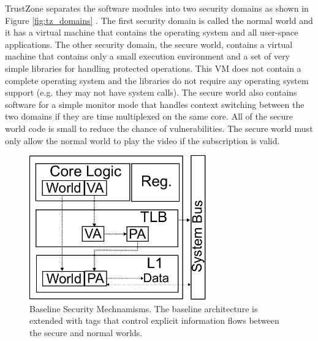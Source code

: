     TrustZone separates the software modules into two security domains as shown 
    in Figure \ref{fig:tz_domains} . The first security domain is called the 
    normal world and it has a virtual machine that contains the operating 
    system and all user-space applications. The other security domain, the 
    secure world, contains a virtual machine that contains only a small 
    execution environment and a set of very simple libraries for handling 
    protected operations. This VM does not contain a complete operating system 
    and the libraries do not require any operating system support (e.g. they 
    may not have system calls). The secure world also contains software for a 
    simple monitor mode that handles context switching between the two domains 
    if they are time multiplexed on the same core. All of the secure world code 
    is small to reduce the chance of vulnerabilities. The secure world must 
    only allow the normal world to play the video if the subscription is valid.


    \begin{figure}
        \begin{center}
            \includegraphics[width=3in]{figs/tz_tags.pdf}
            \caption{Baseline Security Mechnamisms. The baseline architecture 
            is extended with tags that control explicit information flows between the 
            secure and normal worlds.}
            \label{fig:baseline}
        \end{center}
    \end{figure}

